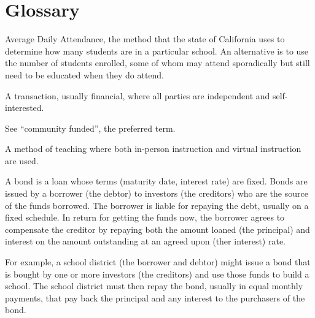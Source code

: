 
\chapter{Glossary}\label{ch:glossary}


\begin{description}[nosep]\OnehalfSpacing%


\medskip\item[ADA] Average Daily Attendance, the method that the state of California uses to determine how many students are in a particular school. An alternative is to use the number of students enrolled, some of whom may attend sporadically but still need to be educated when they do attend.

\medskip\item[arm's length transaction] A transaction, usually financial, where all parties are independent and self-interested.

\medskip\item[basic aid] See ``community funded'', the preferred term.
  
\medskip\item[blended learning] A method of teaching where both in-person instruction and virtual instruction are used.

\medskip\item[bond] A bond is a loan whose terms (maturity date, interest rate) are fixed. Bonds are issued by a borrower (the debtor) to investors (the creditors) who are the source of the funds borrowed. The borrower is liable for repaying the debt,  usually on a fixed schedule. In return for getting the funds now, the borrower agrees to compensate the creditor by repaying both the amount loaned (the principal) and interest on the amount outstanding at an agreed upon (ther interest) rate.

For example, a school district (the borrower and debtor) might issue a bond that is bought by one or more investors (the creditors) and use those funds to build a school. The school district must then repay the bond, usually in equal monthly payments, that pay back the principal and any interest to the  purchasers of the bond.


\end{description}
